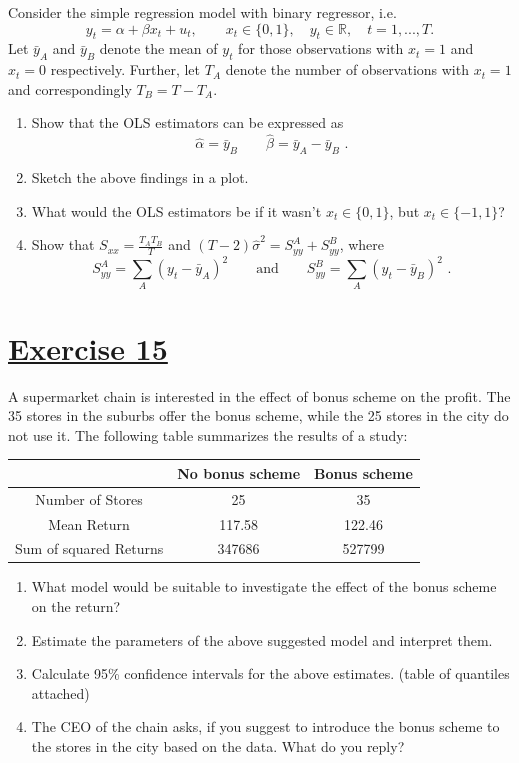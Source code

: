 \documentclass[captions=tableheading, 12pt, headings=small, parskip=half]{scrartcl}
\begin{document}
Consider the simple regression model with binary regressor, i.e.
\[y_t = \alpha + \beta x_t + u_t,\qquad x_t\in\{0,1\},\quad y_t\in\mathbb{R}, \quad t = 1,...,T.\]
Let $\bar{y}_A$ and $\bar{y}_B$ denote the mean of $y_t$ for those observations with $x_t = 1$ and  $x_t = 0$ respectively. Further, let $T_A$ denote the number of observations with $x_t = 1$ and correspondingly $T_B = T - T_A$.
\begin{enumerate}[label = \alph*)]
	\item Show that the OLS estimators can be expressed as
	\[
	\hat{\alpha} = \bar{y}_B \qquad \hat{\beta} = \bar{y}_A - \bar{y}_B\text{ .}
	\]
	\item Sketch the above findings in a plot.
	\item What would the OLS estimators be if it wasn't $x_t\in\{0,1\}$, but $x_t\in\{-1,1\}$?
	\item Show that $S_{xx} = \frac{T_AT_B}{T}$ and $(T-2)\hat{\sigma}^2 = S_{yy}^A + S_{yy}^B$, where \[S_{yy}^A = \sum_{A}{(y_t - \bar{y}_A)^2}\qquad \text{and}\qquad S_{yy}^B = \sum_{A}{(y_t - \bar{y}_B)^2}\text{ .}\]
\end{enumerate}
\newpage


\section*{\underline{Exercise 15}}
A supermarket chain is interested in the effect of bonus scheme on the profit. The 35 stores in the suburbs offer the bonus scheme, while the 25 stores in the city do not use it. The following table summarizes the results of a study:
\begin{table}[h!]
	\centering
	\begin{tabular}{ccc}
		\toprule
		\toprule
		&No bonus scheme & Bonus scheme\\
		\midrule
		Number of Stores&25&35\\
		Mean Return&117.58&122.46\\
		Sum of squared Returns&347686&527799\\
		\bottomrule
		\bottomrule
	\end{tabular}
\end{table}
\begin{enumerate}[label = \alph*)]
	\item What model would be suitable to investigate the effect of the bonus scheme on the return?
	\item Estimate the parameters of the above suggested model and interpret them.
	\item Calculate 95\% confidence intervals for the above estimates. (table of quantiles attached)
	\item The CEO of the chain asks, if you suggest to introduce the bonus scheme to the stores in the city based on the data. What do you reply?
\end{enumerate}
\end{document}
